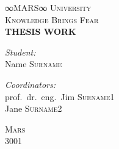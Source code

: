 \documentclass[a4paper]{article}
\begin{document}
\begin{titlepage}

\begin{center}

\textsc{\huge ∞MARS∞ University}\\
\textsc{\huge Knowledge Brings Fear}\\[8cm]

\textbf{\Huge THESIS WORK}\\[6cm]

{\Large

\begin{minipage}[t]{0.4\textwidth}
\begin{flushleft}
\emph{Student:}\\
{\LARGE Name \textsc{Surname}}
\end{flushleft}
\end{minipage}
\begin{minipage}[t]{0.5\textwidth}
\begin{flushright}
\emph{Coordinators:}\\
prof.\ dr.\ eng.\
{\LARGE Jim \textsc{Surname1}}\\
{\LARGE Jane \textsc{Surname2}}
\end{flushright}
\end{minipage}

}

\vfill

\textsc{\Large Mars\\ 3001}

\end{center}

\end{titlepage}
\end{document}
